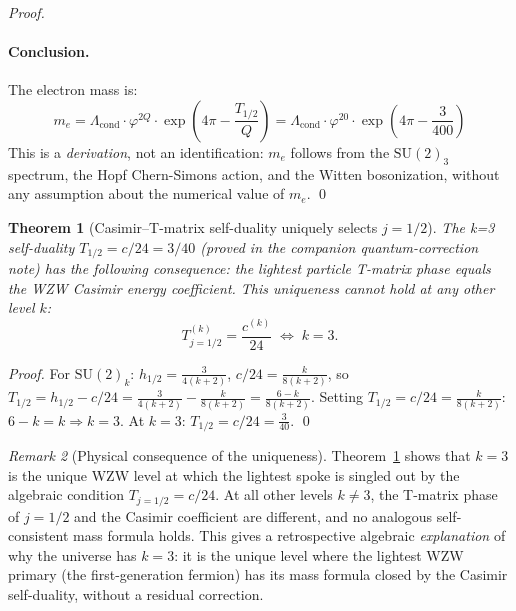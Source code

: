 \documentclass[11pt,a4paper]{article}
\newtheorem{theorem}{Theorem}[section]
\theoremstyle{definition}
\theoremstyle{remark}
\newtheorem{remark}[theorem]{Remark}
\newcommand{\vp}{\varphi}
\newcommand{\Lcond}{\Lambda_{\mathrm{cond}}}
\begin{document}
\begin{proof}
\paragraph{Conclusion.}
The electron mass is:
\begin{equation}
  \boxed{m_e
  = \Lcond\cdot\vp^{2Q}\cdot\exp\!\left(4\pi - \frac{T_{1/2}}{Q}\right)
  = \Lcond\cdot\vp^{20}\cdot\exp\!\left(4\pi - \frac{3}{400}\right)}
  \label{P4:eq:me_derived}
\end{equation}
This is a \emph{derivation}, not an identification: $m_e$ follows from
the $\mathrm{SU}(2)_3$ spectrum, the Hopf Chern-Simons action, and the
Witten bosonization, without any assumption about the numerical value of $m_e$.
\qed
\end{proof}

\begin{theorem}[Casimir--T-matrix self-duality uniquely selects $j=1/2$]
\label{P4:thm:casimir_selects}
The k=3 self-duality $T_{1/2} = c/24 = 3/40$ (proved in the companion
quantum-correction note) has the following consequence: the lightest
particle T-matrix phase equals the WZW Casimir energy coefficient.
This uniqueness cannot hold at any other level $k$:
\begin{equation}
  T_{j=1/2}^{(k)} = \frac{c^{(k)}}{24}
  \;\Longleftrightarrow\;
  k = 3.
  \label{P4:eq:k3_unique}
\end{equation}
\end{theorem}

\begin{proof}
For $\mathrm{SU}(2)_k$: $h_{1/2} = \tfrac{3}{4(k+2)}$,
$c/24 = \tfrac{k}{8(k+2)}$, so
$T_{1/2} = h_{1/2} - c/24 = \tfrac{3}{4(k+2)} - \tfrac{k}{8(k+2)}
= \tfrac{6-k}{8(k+2)}$.
Setting $T_{1/2} = c/24 = \tfrac{k}{8(k+2)}$:
$6-k = k \Rightarrow k=3$.
At $k=3$: $T_{1/2} = c/24 = \tfrac{3}{40}$. \qed
\end{proof}

\begin{remark}[Physical consequence of the uniqueness]
\label{P4:rem:k3_uniqueness_consequence}
Theorem~\ref{P4:thm:casimir_selects} shows that $k=3$ is the unique WZW level
at which the lightest spoke is singled out by the algebraic condition
$T_{j=1/2} = c/24$.
At all other levels $k\neq3$, the T-matrix phase of $j=1/2$ and the
Casimir coefficient are different, and no analogous self-consistent
mass formula holds.
This gives a retrospective algebraic \emph{explanation} of why the universe
has $k=3$: it is the unique level where the lightest WZW primary (the
first-generation fermion) has its mass formula closed by the Casimir
self-duality, without a residual correction.
\end{remark}
\end{document}
